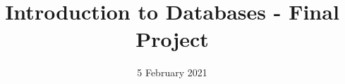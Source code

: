 \documentclass[a4paper,11pt,oneside]{article}
\begin{document}
	\author{}
	\title{\textbf{Introduction to Databases - Final Project}}
	\date{5 February 2021}
	\maketitle

	\tableofcontents
	\newcommand{\sectionbreak}{\clearpage}

	
	
	
	
\end{document}
